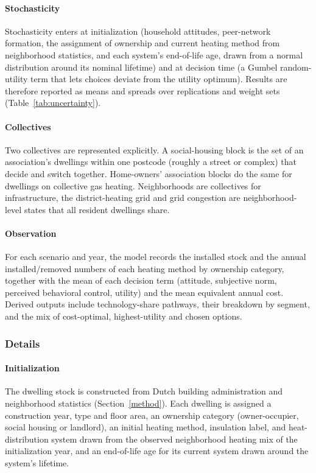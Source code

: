 \documentclass[preprint,12pt,authoryear]{elsarticle}
\begin{document}
\paragraph{Stochasticity}
Stochasticity enters at initialization (household attitudes, peer-network
formation, the assignment of ownership and current heating method from
neighborhood statistics, and each system's end-of-life age, drawn from a
normal distribution around its nominal lifetime) and at decision time (a
Gumbel random-utility term that lets choices deviate from the utility
optimum). Results are therefore reported as means and spreads over
replications and weight sets (Table~\ref{tab:uncertainty}).

\paragraph{Collectives}
Two collectives are represented explicitly. A social-housing block is the set
of an association's dwellings within one postcode (roughly a street or
complex) that decide and switch together. Home-owners' association blocks do the
same for dwellings on collective gas heating. Neighborhoods are collectives
for infrastructure, the district-heating grid and grid congestion are
neighborhood-level states that all resident dwellings share.

\paragraph{Observation}
For each scenario and year, the model records the
installed stock and the annual installed/removed numbers of each heating method
by ownership category, together with the mean of each decision term
(attitude, subjective norm, perceived behavioral control, utility) and the
mean equivalent annual cost. Derived outputs include technology-share
pathways, their breakdown by segment, and the mix of cost-optimal,
highest-utility and chosen options.

\subsubsection{Details}

\paragraph{Initialization}
The dwelling stock is constructed from Dutch building administration and
neighborhood statistics (Section~\ref{method}). Each dwelling is assigned a
construction year, type and floor area, an ownership category
(owner-occupier, social housing or landlord), an initial heating method,
insulation label, and heat-distribution system drawn from the observed
neighborhood heating mix of the initialization year, and an end-of-life age
for its current system drawn around the system's lifetime.
\end{document}
